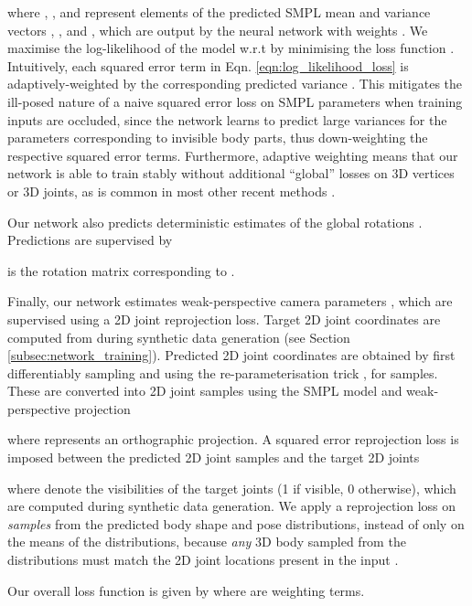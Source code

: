 \documentclass[final]{cvpr}
\begin{document}
where , ,  and  represent elements of the predicted SMPL mean and variance vectors , ,  and , which are output by the neural network  with weights . We maximise the log-likelihood of the model w.r.t  by minimising the loss function . Intuitively, each squared error term in Eqn. \ref{eqn:log_likelihood_loss} is adaptively-weighted by the corresponding predicted variance \cite{kendall2017whatuncertainties}. This mitigates the ill-posed nature of a naive squared error loss on SMPL parameters when training inputs are occluded, since the network learns to predict large variances for the parameters corresponding to invisible body parts, thus down-weighting the respective squared error terms. Furthermore, adaptive weighting means that our network is able to train stably without additional ``global'' losses on 3D vertices or 3D joints, as is common in most other recent methods \cite{STRAPS2020BMVC,pavlakos2018humanshape,kolotouros2019spin,hmrKanazawa17,zhang2019danet}.

Our network also predicts deterministic estimates of the global rotations . Predictions  are supervised by

 is the rotation matrix corresponding to .

Finally, our network estimates weak-perspective camera parameters , which are supervised using a 2D joint reprojection loss. Target 2D joint coordinates  are computed from  during synthetic data generation (see Section \ref{subsec:network_training}). Predicted 2D joint coordinates are obtained by first differentiably sampling  and   using the re-parameterisation trick \cite{kingma2014autoencoding}, for  samples. These are converted into 2D joint samples using the SMPL model and weak-perspective projection

where  represents an orthographic projection. A squared error reprojection loss is imposed between the predicted 2D joint samples and the target 2D joints

where  denote the visibilities of the target joints (1 if visible, 0 otherwise), which are computed during synthetic data generation. We apply a reprojection loss on \textit{samples} from the predicted body shape and pose distributions, instead of only on the means of the distributions, because \textit{any} 3D body sampled from the distributions must match the 2D joint locations present in the input .

Our overall loss function is given by  where  are weighting terms.
\end{document}

